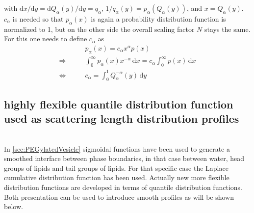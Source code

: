 with  $\mathrm{d}x/\mathrm{d}y=\mathrm{d}Q_\alpha(y)/\mathrm{d}y=q_\alpha$, $1/q_\alpha(y)=p_\alpha(Q_\alpha(y))$, and $x=Q_\alpha(y)$. $c_\alpha$ is needed so that $p_\alpha(x)$ is again a probability distribution function is normalized to 1, but on the other side the overall scaling factor $N$ stays the same. For this one needs to define $c_\alpha$ as
\begin{align}
                   & p_\alpha(x) = c_\alpha x^\alpha p(x) \\
\Rightarrow \qquad & \int_0^\infty p_\alpha(x) x^{-\alpha}\, \mathrm{d}x = c_\alpha \int_0^\infty p(x)\, \mathrm{d}x \\
\Leftrightarrow \qquad & c_\alpha = \int_0^1 Q_\alpha^{-\alpha}(y) \, \mathrm{d}y
\end{align}


\subsection{highly flexible quantile distribution function used as scattering length distribution profiles} ~\\

In \ref{sec:PEGylatedVesicle} sigmoidal functions have been used to generate a smoothed interface between phase boundaries, in that case between water, head groups of lipids and tail groups of lipids. For that specific case the Laplace cumulative distribution function has been used. Actually new more flexible distribution functions are developed in terms of quantile distribution functions. Both presentation can be used to introduce smooth profiles as will be shown below.

